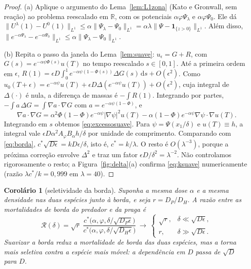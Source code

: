 \documentclass[11pt,a4paper]{article}
\numberwithin{equation}{section}
\newtheorem{corolario}[teorema]{Corolário}
\theoremstyle{definition}
\theoremstyle{remark}
\newcommand{\R}{\mathbb{R}}
\newcommand{\dd}{\,\mathrm{d}}
\begin{document}
\begin{proof}
(a) Aplique o argumento do Lema~\ref{lem:L1zona} (Kato e Gronwall, sem reação) ao problema reescalado
em $\R$, com os potenciais $\alpha\varphi\Psi_\lambda$ e $\alpha\varphi\Psi_0$. Ele dá
$\|U^\lambda(1)-U^0(1)\|_{L^1}\le\alpha\|\Psi_\lambda-\Psi_0\|_{L^1}=\alpha\lambda\|\Psi-\mathbf 1_{\{z>0\}}\|_{L^1}$.
Além disso, $\|e^{-\alpha\Psi_\lambda}-e^{-\alpha\Psi_0}\|_{L^1}\le\alpha\|\Psi_\lambda-\Psi_0\|_{L^1}$.

(b) Repita o passo da janela do Lema~\ref{lem:suave}: $u_\epsilon=G+R$, com $G(s)=e^{-\alpha\psi\Phi(s)}u(T)$ no
tempo reescalado $s\in[0,1]$. Até a primeira ordem em $\epsilon$,
$R(1)=\epsilon D\int_0^1e^{-\alpha\psi(1-\Phi(s))}\Delta G(s)\dd s+O(\epsilon^2)$. Como
$u_0(T+\epsilon)=e^{-\alpha\psi}u(T)+\epsilon D\Delta(e^{-\alpha\psi}u(T))+O(\epsilon^2)$, cuja integral de
$\Delta(\cdot)$ é nula, a diferença de massas é $-\int R(1)$. Integrando por partes,
$-\int a\,\Delta G=\int\nabla a\cdot\nabla G$ com $a=e^{-\alpha\psi(1-\Phi)}$, e
\[
\nabla a\cdot\nabla G=\alpha^2\Phi(1-\Phi)e^{-\alpha\psi}|\nabla\psi|^2u(T)-\alpha(1-\Phi)e^{-\alpha\psi}\nabla\psi\cdot\nabla u(T).
\]
Integrando em $s$ obtemos \eqref{eq:excessosuave}. Para $\psi=\Psi(x_1/\delta)$ e $u(T)\equiv h$, a integral
vale $\epsilon D\alpha^2A_\varphi B_\alpha h/\delta$ por unidade de comprimento. Comparando com
\eqref{eq:borda}, $c^*\sqrt{D\epsilon}=k D\epsilon/\delta$, isto é, $c^*=k/\lambda$. O resto é
$O(\lambda^{-3})$, porque a próxima correção envolve $\Delta^2$ e traz um fator $\epsilon D/\delta^2=\lambda^{-2}$.
Não controlamos rigorosamente o resto; a Figura~\ref{fig:delta}(a) confirma \eqref{eq:ksuave} numericamente
(razão $\lambda c^*/k=0{,}999$ em $\lambda=40$).
\end{proof}

\begin{corolario}[seletividade da borda]\label{cor:seletividade}
Suponha a mesma dose $\alpha$ e a mesma densidade nas duas espécies junto à borda, e seja $r=D_P/D_H$.
A razão entre as mortalidades de borda do predador e da praga é
\[
\mathcal R(\delta)=\sqrt r\;\frac{c^*\big(\alpha,\varphi,\delta/\sqrt{D_P\epsilon}\big)}{c^*\big(\alpha,\varphi,\delta/\sqrt{D_H\epsilon}\big)}
\ \longrightarrow\ \begin{cases}\sqrt r,&\delta\ll\sqrt{D\epsilon},\\ r,&\delta\gg\sqrt{D\epsilon}.\end{cases}
\]
Suavizar a borda \emph{reduz} a mortalidade de borda das duas espécies, mas a torna \emph{mais seletiva}
contra a espécie mais móvel: a dependência em $D$ passa de $\sqrt D$ para $D$.
\end{corolario}
\end{document}
